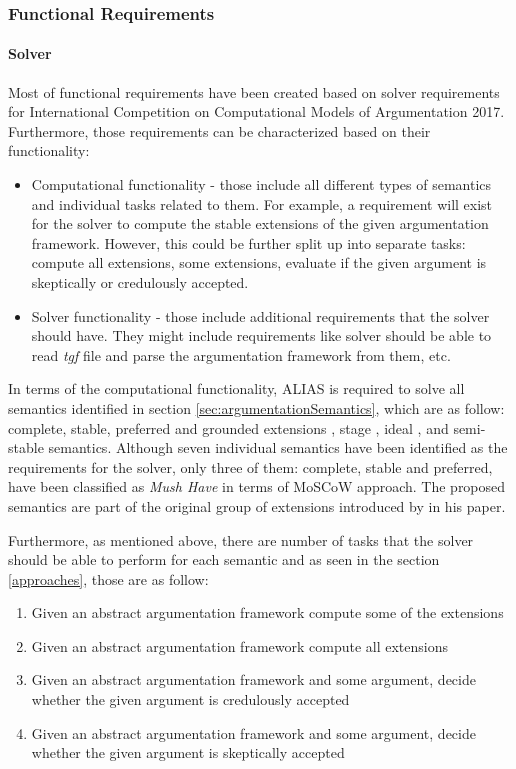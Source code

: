 \subsubsection{Functional Requirements}

\paragraph{Solver}

Most of functional requirements have been created based on solver requirements for International Competition on Computational Models of Argumentation 2017. Furthermore, those requirements can be characterized based on their functionality:
\begin{itemize}
	\item Computational functionality - those include all different types of semantics and individual tasks related to them. For example, a requirement will exist for the solver to compute the stable extensions of the given argumentation framework. However, this could be further split up into separate tasks: compute all extensions, some extensions, evaluate if the given argument is skeptically or credulously accepted.
	\item Solver functionality - those include additional requirements that the solver should have. They might include requirements like solver should be able to read \textit{tgf} file and parse the argumentation framework from them, etc.
\end{itemize}

In terms of the computational functionality, ALIAS is required to solve all semantics identified in section \ref{sec:argumentationSemantics}, which are as follow: complete, stable, preferred and grounded extensions \citep{dung1995}, stage \citep{verheij1996two}, ideal \citep{dung2007computing}, and semi-stable \citep{caminada2006semi} semantics. Although seven individual semantics have been identified as the requirements for the solver, only three of them: complete, stable and preferred, have been classified as \textit{Mush Have} in terms of MoSCoW approach. The proposed semantics are part of the original group of extensions introduced by \citet{dung1995} in his paper. 

Furthermore, as mentioned above, there are number of tasks that the solver should be able to perform for each semantic and as seen in the section \ref{approaches}, those are as follow:
\begin{enumerate}
	\item Given an abstract argumentation framework compute some of the extensions
	\item Given an abstract argumentation framework compute all extensions
	\item Given an abstract argumentation framework and some argument, decide whether the given argument is credulously accepted
	\item Given an abstract argumentation framework and some argument, decide whether the given argument is skeptically accepted
\end{enumerate}

